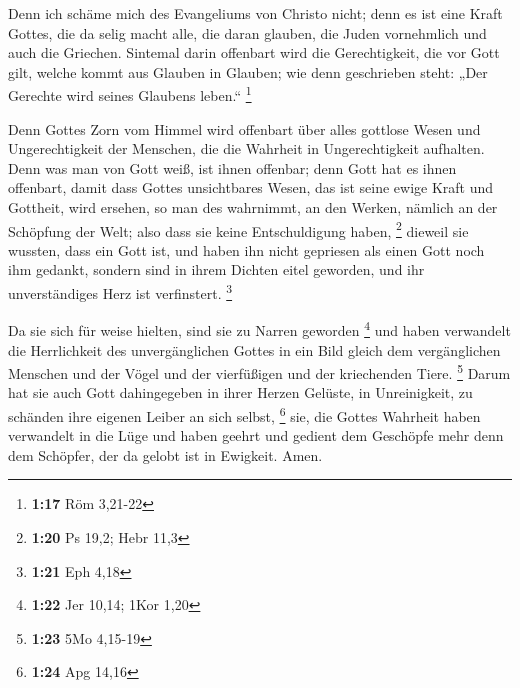  Denn ich schäme mich des Evangeliums von Christo nicht;
denn es ist eine Kraft Gottes, die da selig macht alle, die daran
glauben, die Juden vornehmlich und auch die Griechen. 
Sintemal darin offenbart wird die Gerechtigkeit, die vor Gott gilt,
welche kommt aus Glauben in Glauben; wie denn geschrieben steht: „Der
Gerechte wird seines Glaubens leben.`` \footnote{\textbf{1:17} Röm
  3,21-22}

 Denn Gottes Zorn vom Himmel wird offenbart über alles
gottlose Wesen und Ungerechtigkeit der Menschen, die die Wahrheit in
Ungerechtigkeit aufhalten.  Denn was man von Gott weiß, ist
ihnen offenbar; denn Gott hat es ihnen offenbart,  damit
dass Gottes unsichtbares Wesen, das ist seine ewige Kraft und Gottheit,
wird ersehen, so man des wahrnimmt, an den Werken, nämlich an der
Schöpfung der Welt; also dass sie keine Entschuldigung haben,
\footnote{\textbf{1:20} Ps 19,2; Hebr 11,3}  dieweil sie
wussten, dass ein Gott ist, und haben ihn nicht gepriesen als einen Gott
noch ihm gedankt, sondern sind in ihrem Dichten eitel geworden, und ihr
unverständiges Herz ist verfinstert. \footnote{\textbf{1:21} Eph 4,18}

 Da sie sich für weise hielten, sind sie zu Narren geworden
\footnote{\textbf{1:22} Jer 10,14; 1Kor 1,20}  und haben
verwandelt die Herrlichkeit des unvergänglichen Gottes in ein Bild
gleich dem vergänglichen Menschen und der Vögel und der vierfüßigen und
der kriechenden Tiere. \footnote{\textbf{1:23} 5Mo 4,15-19}
 Darum hat sie auch Gott dahingegeben in ihrer Herzen
Gelüste, in Unreinigkeit, zu schänden ihre eigenen Leiber an sich
selbst, \footnote{\textbf{1:24} Apg 14,16}  sie, die Gottes
Wahrheit haben verwandelt in die Lüge und haben geehrt und gedient dem
Geschöpfe mehr denn dem Schöpfer, der da gelobt ist in Ewigkeit. Amen.

